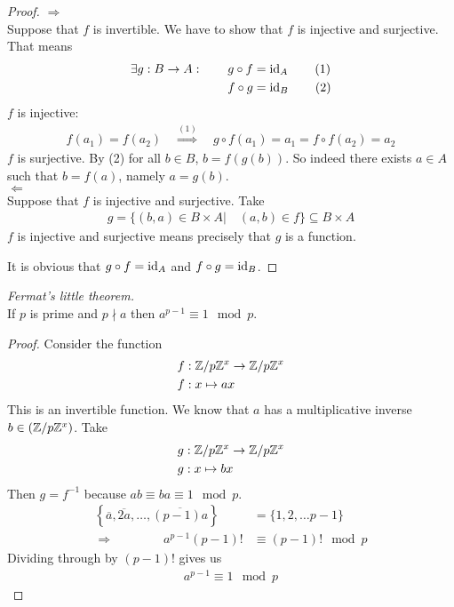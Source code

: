 \begin{proof}
	$\Rightarrow$ \\
	Suppose that $f$ is invertible. We have to show that $f$ is injective and surjective. That means
	\begin{align*}
	\exists g: B \to A: \qquad g \circ f & = \operatorname{id}_A \tag{1} \\
	f \circ g & = \operatorname{id}_B \tag{2}
	\end{align*}
	$f$ is injective:
	\begin{align*}
	f(a_1) = f(a_2) \quad \overset{(1)}{\Rightarrow} \quad g \circ f(a_1) = a_1 = f \circ f(a_2) = a_2
	\end{align*}
	$f$ is surjective. By (2) for all $b \in B$, $b = f(g(b))$. So indeed there exists $a \in A$ such that $b= f(a)$, namely $a=g(b)$. \\
	$\Leftarrow$ \\
	Suppose that $f$ is injective and surjective. Take
	\begin{align*}
		g = \{(b,a) \in B \times A| \quad (a,b) \in f \} \subseteq B \times A
	\end{align*}
	$f$ is injective and surjective means precisely that $g$ is a function.
	
	It is obvious that $g \circ f = \operatorname{id}_A$ and $f \circ g = \operatorname{id}_B$. 
\end{proof}


\begin{tm} \emph{Fermat's little theorem.} \\
	If $p$ is prime and $p \nmid a$ then $a^{p-1} \equiv 1 \mod p$.
\end{tm}

\begin{proof}
	Consider the function
	\begin{align*}
	f& : \mathbb Z/p\mathbb Z^x \to \mathbb Z/p\mathbb Z^x \\
	f& : x \mapsto ax
	\end{align*}
	This is an invertible function. We know that $a$ has a multiplicative inverse $b \in (\mathbb Z/p\mathbb Z^x)$. Take 
	\begin{align*}
	g & : \mathbb Z/p\mathbb Z^x \to \mathbb Z/p\mathbb Z^x \\
	g & : x \mapsto bx
	\end{align*} 
	Then $g = f^{-1}$ because $ab \equiv ba \equiv 1 \mod p$.
	\begin{align*}
	\left\{ \overline a, \overline{2a}, \dots, \overline {(p-1)a} \right\}&  = \{1,2, \dots p-1\} \\
	\Rightarrow \qquad \qquad a^{p-1} (p-1)! & \equiv (p-1)! \mod p
	\end{align*}
	Dividing through by $(p-1)!$ gives us
	\begin{align*}
	a^{p-1} \equiv 1 \mod p
	\end{align*}
\end{proof}

